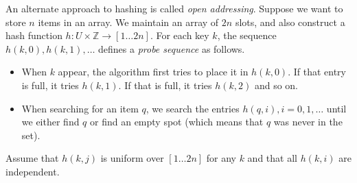 \documentclass[addpoints]{exam}
\def\checkmark{\tikz\fill[scale=0.4](0,.35) -- (.25,0) -- (1,.7) -- (.25,.15) -- cycle;}
\renewcommand{\P}[1]{\left( #1\right)}
\begin{document}
\begin{questions}
An alternate approach to hashing is called \emph{open addressing}. Suppose we
want to store $n$ items in an array. We maintain an array of $2n$ slots, and
also construct a hash function $h : U \times {\mathbb Z} \rightarrow [1\ldots
2n]$. For each key $k$, the sequence $h(k, 0), h(k, 1), \ldots$ defines a
\emph{probe sequence} as follows. 

\begin{itemize}
\item When $k$ appear, the algorithm first tries to place it in $h(k,0)$. If
  that entry is full, it tries $h(k, 1)$. If that is full, it tries $h(k, 2)$
  and so on.

\item   When searching for an item $q$, we search the entries
  $h(q, i), i = 0, 1, \ldots$ until we either find $q$ or find an empty spot
  (which means that $q$ was never in the set).
\end{itemize}

Assume that $h(k, j)$ is uniform over $[1\ldots 2n]$ for any $k$ and that all
$h(k, i)$ are independent. 

\end{questions}
\end{document}
